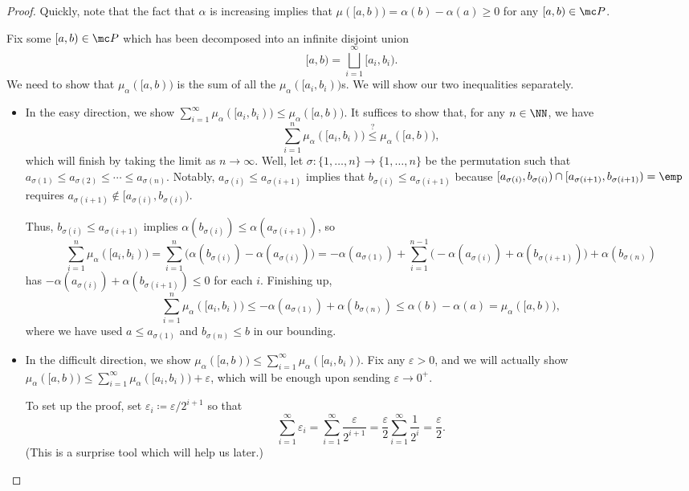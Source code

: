 \documentclass[../notes.tex]{subfiles}
\begin{document}
\begin{proof}
	Quickly, note that the fact that $\alpha$ is increasing implies that $\mu([a,b))=\alpha(b)-\alpha(a)\ge0$ for any $[a,b)\in\mc P$.
	
	Fix some $[a,b)\in\mc P$ which has been decomposed into an infinite disjoint union
	\[[a,b)=\bigsqcup_{i=1}^\infty[a_i,b_i).\]
	We need to show that $\mu_\alpha([a,b))$ is the sum of all the $\mu_\alpha([a_i,b_i))$s. We will show our two inequalities separately.
	\begin{itemize}
		\item In the easy direction, we show $\sum_{i=1}^\infty\mu_\alpha([a_i,b_i))\le\mu_\alpha([a,b))$. It suffices to show that, for any $n\in\NN$, we have
		\[\sum_{i=1}^n\mu_\alpha([a_i,b_i))\stackrel?\le\mu_\alpha([a,b)),\]
		which will finish by taking the limit as $n\to\infty$. Well, let $\sigma\colon\{1,\ldots,n\}\to\{1,\ldots,n\}$ be the permutation such that $a_{\sigma(1)}\le a_{\sigma(2)}\le\cdots\le a_{\sigma(n)}$. Notably, $a_{\sigma(i)}\le a_{\sigma(i+1)}$ implies that $b_{\sigma(i)}\le a_{\sigma(i+1)}$ because $[a_{\sigma(i)},b_{\sigma(i)})\cap[a_{\sigma(i+1)},b_{\sigma(i+1)})=\emp$ requires $a_{\sigma(i+1)}\notin[a_{\sigma(i)},b_{\sigma(i)})$.

		Thus, $b_{\sigma(i)}\le a_{\sigma(i+1)}$ implies $\alpha(b_{\sigma(i)})\le\alpha(a_{\sigma(i+1)})$, so
		\[\sum_{i=1}^n\mu_\alpha([a_i,b_i))=\sum_{i=1}^n\big(\alpha(b_{\sigma(i)})-\alpha(a_{\sigma(i)})\big)=-\alpha(a_{\sigma(1)})+\sum_{i=1}^{n-1}\big(-\alpha(a_{\sigma(i)})+\alpha(b_{\sigma(i+1)})\big)+\alpha(b_{\sigma(n)})\]
		has $-\alpha(a_{\sigma(i)})+\alpha(b_{\sigma(i+1)})\le0$ for each $i$. Finishing up,
		\[\sum_{i=1}^n\mu_\alpha([a_i,b_i))\le-\alpha(a_{\sigma(1)})+\alpha(b_{\sigma(n)})\le\alpha(b)-\alpha(a)=\mu_\alpha([a,b)),\]
		where we have used $a\le a_{\sigma(1)}$ and $b_{\sigma(n)}\le b$ in our bounding.
		\item In the difficult direction, we show $\mu_\alpha([a,b))\le\sum_{i=1}^\infty\mu_\alpha([a_i,b_i))$. Fix any $\varepsilon>0$, and we will actually show $\mu_\alpha([a,b))\le\sum_{i=1}^\infty\mu_\alpha([a_i,b_i))+\varepsilon$, which will be enough upon sending $\varepsilon\to0^+$.

		To set up the proof, set $\varepsilon_i\coloneqq\varepsilon/2^{i+1}$ so that
		\[\sum_{i=1}^\infty\varepsilon_i=\sum_{i=1}^\infty\frac\varepsilon{2^{i+1}}=\frac\varepsilon2\sum_{i=1}^\infty\frac1{2^i}=\frac\varepsilon2.\]
		(This is a surprise tool which will help us later.)


\end{itemize}
\end{proof}
\end{document}
